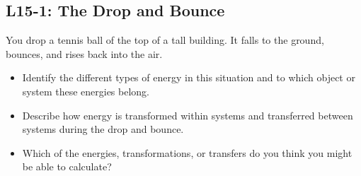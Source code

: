 \documentclass[]{article}
\newcommand{\Week}{15}
\begin{document}
\begin{PresentSpace}
\vspace{-10pt}
\section*{L\Week-1: The Drop and Bounce}
\vspace{-10pt}
You drop a tennis ball of the top of a tall building. It falls to the ground, bounces, and rises back into the air.
\begin{itemize}
	\item Identify the different types of energy in this situation and to which object or system these energies belong.
	\item Describe how energy is transformed within systems and transferred between systems during the drop and bounce.
	\item Which of the energies, transformations, or transfers do you think you might be able to calculate?
\end{itemize}
\end{PresentSpace}
\newpage
\end{document}
